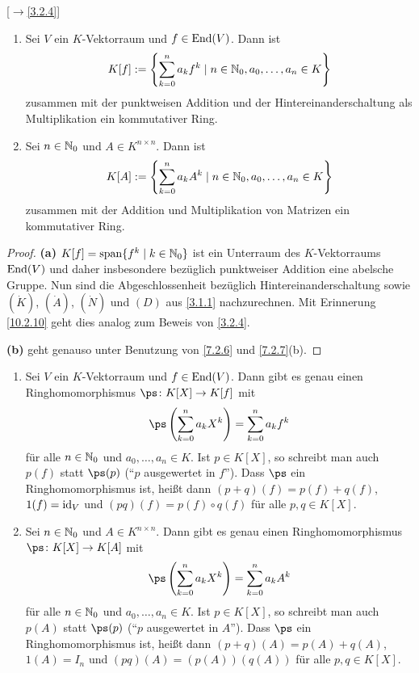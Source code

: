 \documentclass[../../main.tex]{subfiles}
\begin{document}
\begin{defprop}\mbox{}[$\to$\ref{3.2.4}]\label{10.2.11}
\begin{enumerate}[\normalfont(a)]
\item Sei $V$ ein $K$-Vektorraum und $f\in\operatorname{End}(V)$. Dann ist
\[K[f]:=\left\{\sum_{k=0}^na_kf^k\mid n\in\mathbb N_0,a_0,\dots,a_n\in K\right\}\]
zusammen mit der punktweisen Addition und der Hintereinanderschaltung als Multiplikation ein kommutativer Ring.
\item Sei $n\in\mathbb N_0$ und $A\in K^{n\times n}$. Dann ist
\[K[A]:=\left\{\sum_{k=0}^na_kA^k\mid n\in\mathbb N_0,a_0,\dots,a_n\in K\right\}\]
zusammen mit der Addition und Multiplikation von Matrizen ein kommutativer Ring.
\end{enumerate}
\end{defprop}

\begin{proof}
\textbf{(a)} $K[f]=\operatorname{span}\{f^k\mid k\in\mathbb N_0\}$ ist ein Unterraum des $K$-Vektorraums $\operatorname{End}(V)$ und daher insbesondere bezüglich punktweiser Addition eine abelsche Gruppe.
Nun sind die Abgeschlossenheit bezüglich Hintereinanderschaltung sowie $(\dot K)$, $(\dot A)$, $(\dot N)$ und $(D)$ aus \ref{3.1.1} nachzurechnen. Mit Erinnerung \ref{10.2.10}
geht dies analog zum Beweis von \ref{3.2.4}.

\medskip\noindent
\textbf{(b)} geht genauso unter Benutzung von \ref{7.2.6} und \ref{7.2.7}(b).
\end{proof}

\begin{satdef}\label{10.2.12}
\begin{enumerate}[\rm(a)]
\item Sei $V$ ein $K$-Vektorraum und $f\in\operatorname{End}(V)$. Dann gibt es genau einen Ringhomomorphismus $\ps\colon K[X]\to K[f]$ mit
\[\ps\left(\sum_{k=0}^na_kX^k\right)=\sum_{k=0}^na_kf^k\] für alle $n\in\mathbb N_0$ und $a_0,\dots,a_n\in K$. Ist $p\in K[X]$, so schreibt man auch $p(f)$ statt $\ps(p)$ ("`$p$ ausgewertet in $f$"'). Dass $\ps$ ein Ringhomomorphismus ist, heißt dann $(p+q)(f)=p(f)+q(f)$, $1(f)=\operatorname{id}_V$ und $(pq)(f)=p(f)\circ q(f)$ für alle $p,q\in K[X]$.
\item Sei $n\in\mathbb N_0$ und $A\in K^{n\times n}$. Dann gibt es genau einen Ringhomomorphismus $\ps\colon K[X]\to K[A]$ mit
\[\ps\left(\sum_{k=0}^na_kX^k\right)=\sum_{k=0}^na_kA^k\] für alle $n\in\mathbb N_0$ und $a_0,\dots,a_n\in K$.
Ist $p\in K[X]$, so schreibt man auch $p(A)$ statt $\ps(p)$ ("`$p$ ausgewertet in $A$"').
Dass $\ps$ ein Ringhomomorphismus ist, heißt dann $(p+q)(A)=p(A)+q(A)$, $1(A)=I_n$ und $(pq)(A)=(p(A))(q(A))$ für alle $p,q\in K[X]$.
\end{enumerate}
\end{satdef}
\end{document}
